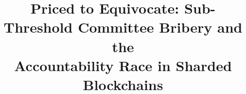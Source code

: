 \documentclass[conference]{IEEEtran}
\begin{document}
\title{Priced to Equivocate: Sub-Threshold Committee Bribery and the\\
Accountability Race in Sharded Blockchains}

\author{}

\maketitle





\end{document}
